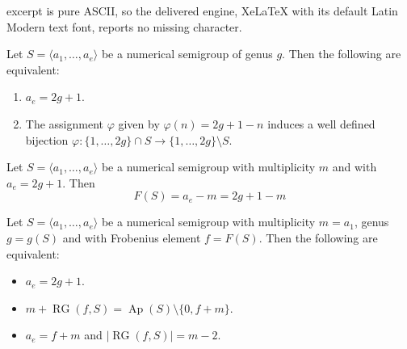 \documentclass[10pt,a4paper]{amsart}
\begin{document}
excerpt is pure ASCII, so the delivered engine, XeLaTeX with its default Latin Modern text font, reports no missing character.
\begin{proposition}\label{prop:ae_maximal} 
Let $S = \langle a_1, \ldots , a_e \rangle$ be a numerical 
semigroup of genus $g$. Then the following are equivalent: 
\begin{enumerate}
    	\item $a_e = 2g+1$.
    	\item The assignment $\varphi$ given by  $\varphi(n) = 2g+1 - n$ 
	induces a well defined bijection $\varphi: \{1, \ldots, 2g\} \cap S 
	\longrightarrow \{1, \ldots, 2g \} \setminus S$.   
\end{enumerate}
\end{proposition}

\begin{corollary}\label{cor:an_frob}
Let $S = \langle a_1, \ldots, a_e\rangle$ be a numerical semigroup with multiplicity $m$ 
and with $a_e = 2g+1$. Then 
	$$ F(S) = a_e - m = 2g+1 - m $$
\end{corollary}

\begin{proposition}\label{prop:gplusm_refelcted}
Let $S = \langle a_1, \ldots, a_e\rangle$ be a numerical semigroup with multiplicity 
$m=a_1$, genus $g = g(S)$ and with Frobenius element $f = F(S)$. Then the 
following are equivalent: 
\begin{itemize}
\item[i)] $a_e = 2 g+1$. 
\item[ii)] $m+\operatorname{RG}(f, S) = \operatorname{Ap}(S) 
\setminus \{0, f+m\}$. 
\item[iii)] $a_e = f+m$ and $\vert \operatorname{RG}(f, S) \vert = m-2$.
\end{itemize}
\end{proposition}
\end{document}
